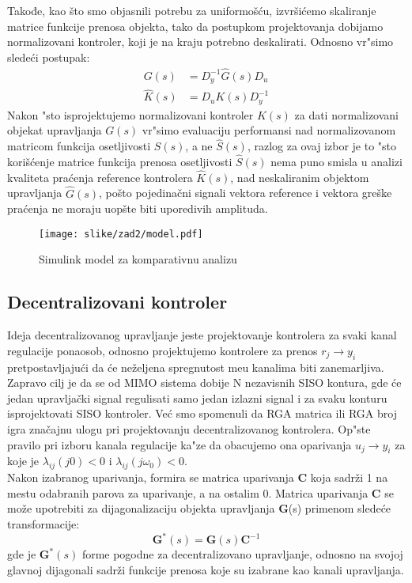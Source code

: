 \documentclass[a4paper,11pt]{article}
\theoremstyle{definition} \newtheorem{deff}{Definicija}[section]
\theoremstyle{definition} \newtheorem{prim}[deff]{Primer}
\theoremstyle{plain} \newtheorem{teor}[deff]{Teorema}
\begin{document}
	
	Takođe, kao što smo objasnili potrebu za uniformošću, izvršićemo skaliranje matrice funkcije prenosa objekta, tako da postupkom projektovanja dobijamo normalizovani kontroler, koji je na kraju potrebno deskalirati. Odnosno vr"simo slede\'ci postupak:
	\begin{align}
		G(s) &= D^{-1}_y\hat{G}(s)D_u \\
		\hat{K}(s) &= D_uK(s)D^{-1}_y
	\end{align}
	\noindent Nakon "sto isprojektujemo normalizovani kontroler $K(s)$ za dati normalizovani objekat upravljanja $G(s)$ vr"simo evaluaciju performansi nad normalizovanom matricom funkcija osetljivosti $S(s)$, a ne $\hat{S}(s)$, razlog za ovaj izbor je to "sto korišćenje matrice funkcija prenosa osetljivosti $\hat{S}(s)$
	nema puno smisla u analizi kvaliteta praćenja reference kontrolera $\hat{K}(s)$, nad neskaliranim 
	objektom upravljanja $\hat{G}(s)$, pošto pojedinačni signali vektora reference i 
	vektora greške praćenja ne moraju uopšte biti uporedivih amplituda.
	\begin{figure}[!h]
		\centering
		\texttt{[image: slike/zad2/model.pdf]}
		\caption{Simulink model za komparativnu analizu }
		\label{fig:model_sim}
	\end{figure}
	\clearpage
	\subsection{Decentralizovani kontroler}
	Ideja decentralizovanog upravljanje jeste projektovanje kontrolera za svaki kanal regulacije ponaosob, odnosno projektujemo kontrolere za prenos $r_j \rightarrow y_i$ pretpostavljajući da \'ce neželjena spregnutost me\dj{}u kanalima biti zanemarljiva. Zapravo cilj je da se od MIMO sistema dobije N nezavisnih SISO kontura, gde će jedan upravljački signal regulisati samo jedan izlazni signal i za svaku konturu isprojektovati SISO kontroler. Već smo spomenuli da RGA matrica ili RGA broj igra značajnu ulogu pri projektovanju decentralizovanog kontrolera. Op"ste pravilo pri izboru kanala regulacije ka"ze da obacujemo ona oparivanja $u_j \rightarrow y_i$ za koje je $\lambda_{ij}(j0) < 0$ i $\lambda_{ij}(j\omega_0) < 0$.\\
	
	Nakon izabranog uparivanja, formira se matrica uparivanja \textbf{C} koja sadrži 1 na mestu odabranih parova za uparivanje, a na ostalim 0. Matrica uparivanja \textbf{C} se može upotrebiti za dijagonalizaciju objekta upravljanja \textbf{G}(s) primenom slede\'ce transformacije:
	\begin{equation}
		\mathbf{G}^*(s) = \mathbf{G}(s) \mathbf{C}^{-1}
	\end{equation}
	gde je $\mathbf{G}^*(s)$ forme pogodne za decentralizovano upravljanje, odnosno na svojoj glavnoj dijagonali sadrži funkcije prenosa koje su izabrane kao kanali upravljanja.\\
	
\end{document}
